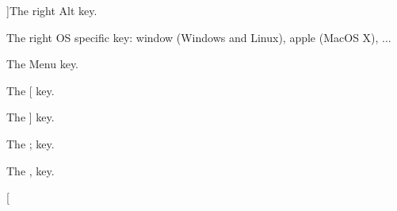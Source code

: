 \begin{Desc}
\begin{description}
{}]The right Alt key. \item[{\em 
\hypertarget{classsf_1_1_keyboard_acb4cacd7cc5802dec45724cf3314a142a9a33b3424ae40d9444998c082e043023}{R\-System}\label{classsf_1_1_keyboard_acb4cacd7cc5802dec45724cf3314a142a9a33b3424ae40d9444998c082e043023}
}]The right O\-S specific key\-: window (Windows and Linux), apple (Mac\-O\-S X), ... \item[{\em 
\hypertarget{classsf_1_1_keyboard_acb4cacd7cc5802dec45724cf3314a142a9bc484e613880a7b96e234f898d62959}{Menu}\label{classsf_1_1_keyboard_acb4cacd7cc5802dec45724cf3314a142a9bc484e613880a7b96e234f898d62959}
}]The Menu key. \item[{\em 
\hypertarget{classsf_1_1_keyboard_acb4cacd7cc5802dec45724cf3314a142afd3acacb771b712d9a5e10620c744506}{L\-Bracket}\label{classsf_1_1_keyboard_acb4cacd7cc5802dec45724cf3314a142afd3acacb771b712d9a5e10620c744506}
}]The \mbox{[} key. \item[{\em 
\hypertarget{classsf_1_1_keyboard_acb4cacd7cc5802dec45724cf3314a142acac262f9ac629ef88658b6f2a2369d37}{R\-Bracket}\label{classsf_1_1_keyboard_acb4cacd7cc5802dec45724cf3314a142acac262f9ac629ef88658b6f2a2369d37}
}]The \mbox{]} key. \item[{\em 
\hypertarget{classsf_1_1_keyboard_acb4cacd7cc5802dec45724cf3314a142a9b22353efcc6a3dd0e17b2892b22baef}{Semi\-Colon}\label{classsf_1_1_keyboard_acb4cacd7cc5802dec45724cf3314a142a9b22353efcc6a3dd0e17b2892b22baef}
}]The ; key. \item[{\em 
\hypertarget{classsf_1_1_keyboard_acb4cacd7cc5802dec45724cf3314a142a9dd5eb9a5c45ca7cc3d4abd0d371128d}{Comma}\label{classsf_1_1_keyboard_acb4cacd7cc5802dec45724cf3314a142a9dd5eb9a5c45ca7cc3d4abd0d371128d}
}]The , key. \item[{\em 
}
\end{description}
\end{Desc}

